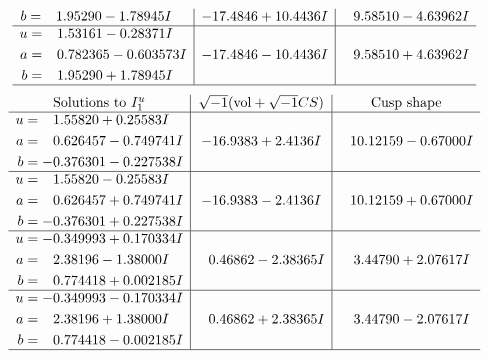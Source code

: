 \documentclass[1p]{elsarticle_modified}
\theoremstyle{definition}
\newcommand{\I}{\sqrt{-1}}
\begin{document}
$$\begin{array}{c|c|c}
\begin{aligned}
b &= \phantom{-}1.95290 - 1.78945 I\end{aligned}
 & -17.4846 + 10.4436 I & \phantom{-}9.58510 - 4.63962 I \\ \hline\begin{aligned}
u &= \phantom{-}1.53161 - 0.28371 I \\
a &= \phantom{-}0.782365 - 0.603573 I \\
b &= \phantom{-}1.95290 + 1.78945 I\end{aligned}
 & -17.4846 - 10.4436 I & \phantom{-}9.58510 + 4.63962 I\\
 \hline 
 \end{array}$$\newpage$$\begin{array}{c|c|c}  
\text{Solutions to }I^u_{1}& \I (\text{vol} + \sqrt{-1}CS) & \text{Cusp shape}\\
 \hline 
\begin{aligned}
u &= \phantom{-}1.55820 + 0.25583 I \\
a &= \phantom{-}0.626457 - 0.749741 I \\
b &= -0.376301 - 0.227538 I\end{aligned}
 & -16.9383 + 2.4136 I & \phantom{-}10.12159 - 0.67000 I \\ \hline\begin{aligned}
u &= \phantom{-}1.55820 - 0.25583 I \\
a &= \phantom{-}0.626457 + 0.749741 I \\
b &= -0.376301 + 0.227538 I\end{aligned}
 & -16.9383 - 2.4136 I & \phantom{-}10.12159 + 0.67000 I \\ \hline\begin{aligned}
u &= -0.349993 + 0.170334 I \\
a &= \phantom{-}2.38196 - 1.38000 I \\
b &= \phantom{-}0.774418 + 0.002185 I\end{aligned}
 & \phantom{-}0.46862 - 2.38365 I & \phantom{-}3.44790 + 2.07617 I \\ \hline\begin{aligned}
u &= -0.349993 - 0.170334 I \\
a &= \phantom{-}2.38196 + 1.38000 I \\
b &= \phantom{-}0.774418 - 0.002185 I\end{aligned}
 & \phantom{-}0.46862 + 2.38365 I & \phantom{-}3.44790 - 2.07617 I\\
 \hline 
 \end{array}$$\newpage\newpage\renewcommand{\arraystretch}{1}
\end{document}
